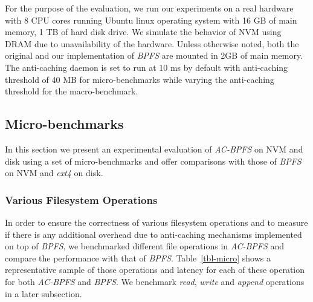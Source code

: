 For the purpose of the evaluation, we run our experiments on a real hardware with 8 CPU cores running Ubuntu linux operating system with 16 GB of main memory, 1 TB of hard disk drive. We simulate the behavior of NVM using DRAM due to unavailability of the hardware. Unless otherwise noted, both the original and our implementation of \textit{BPFS} are mounted in 2GB of main memory. The anti-caching daemon is set to run at 10 ms by default with anti-caching threshold of 40 MB for micro-benchmarks while varying the anti-caching threshold for the macro-benchmark.

\subsection{Micro-benchmarks}
In this section we present an experimental evaluation of \textit{AC-BPFS} on NVM and disk using a set of micro-benchmarks and offer comparisons with those of \textit{BPFS} on NVM and \textit{ext4} on disk. 

\subsubsection{Various Filesystem Operations}
In order to ensure the correctness of various filesystem operations and to measure if there is any additional overhead due to anti-caching mechanisms implemented on top of \textit{BPFS}, we benchmarked different file operations in \textit{AC-BPFS} and compare the performance with that of \textit{BPFS}. Table~\ref{tbl-micro} shows a representative sample of those operations and latency for each of these operation for both \textit{AC-BPFS} and \textit{BPFS}. We benchmark \textit{read}, \textit{write} and \textit{append} operations in a later subsection. 


